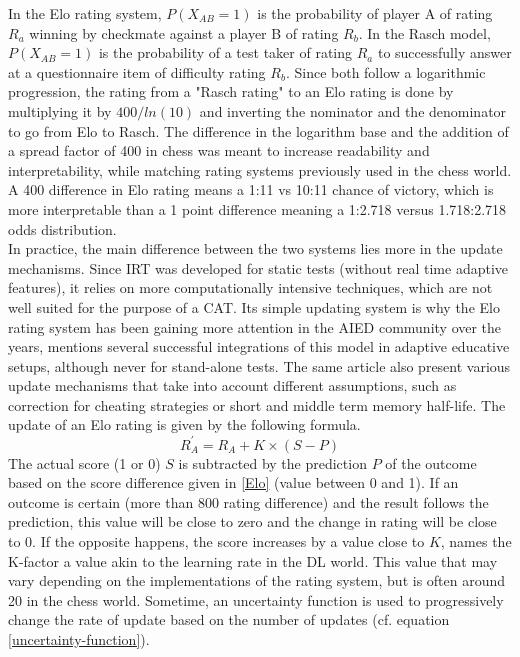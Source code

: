In the Elo rating system, $P(X_{AB} = 1)$ is the probability of player A of rating $R_a$ winning by checkmate against a player B of rating $R_b$. In the Rasch model, $P(X_{AB} = 1)$ is the probability of a test taker of rating $R_a$ to successfully answer at a questionnaire item of difficulty rating $R_b$. Since both follow a logarithmic progression, the rating from a "Rasch rating" to an Elo rating is done by multiplying it by $400/ln(10)$ and inverting the nominator and the denominator to go from Elo to Rasch. The difference in the logarithm base and the addition of a spread factor of 400 in chess was meant to increase readability and interpretability, while matching rating systems previously used in the chess world. A 400 difference in Elo rating means a 1:11 vs 10:11 chance of victory, which is more interpretable than a 1 point difference meaning a 1:2.718 versus 1.718:2.718 odds distribution.\\
In practice, the main difference between the two systems lies more in the update mechanisms. Since IRT was developed for static tests (without real time adaptive features), it relies on more computationally intensive techniques, which are not well suited for the purpose of a CAT. Its simple updating system is why the Elo rating system has been gaining more attention in the AIED community over the years, \cite{pelanek_applications_2016} mentions several successful integrations of this model in adaptive educative setups, although never for stand-alone tests. The same article also present various update mechanisms that take into account different assumptions, such as correction for cheating strategies or short and middle term memory half-life. The update of an Elo rating is given by the following formula.
\begin{equation}
    R_{A}^{\prime}= R_A+K \times{(S-P)}
    \label{Update Elo}
\end{equation}
The actual score (1 or 0) $S$ is subtracted by the prediction $P$ of the outcome based on the score difference given in \ref{Elo} (value between 0 and 1). If an outcome is certain (more than 800 rating difference) and the result follows the prediction, this value will be close to zero and the change in rating will be close to 0. If the opposite happens, the score increases by a value close to $K$, names the K-factor a value akin to the learning rate in the DL world. This value that may vary depending on the implementations of the rating system, but is often around 20 in the chess world. Sometime, an uncertainty function is used to progressively change the rate of update based on the number of updates (cf. equation \ref{uncertainty-function}).

